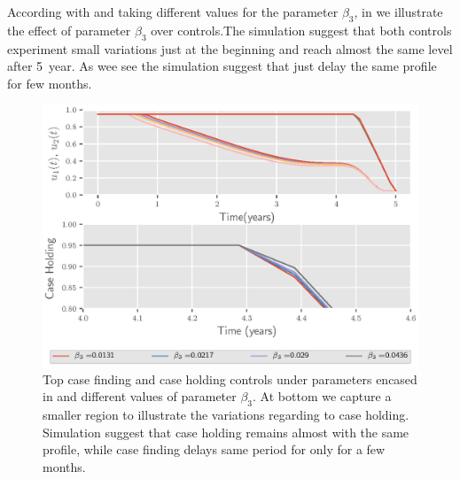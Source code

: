 According with  and taking different values
for the parameter $\beta_3$, in  we illustrate 
the effect of parameter $\beta_3$ over controls.The 
simulation suggest that both controls experiment small variations just at the 
beginning and reach almost the same level after \SI{5}{year}. As wee see the 
simulation suggest that just delay the same profile for few months.
%
\begin{figure}
  \centering
  \includegraphics{Figures/figure_2_two_strain_tbm}
  \caption{
    Top case finding and case holding controls 
    under parameters encased in  and
    different values of parameter $\beta_3$. At bottom we capture a smaller
    region to illustrate the variations regarding to case holding. Simulation 
    suggest 
    that case holding remains almost with the same profile, while case finding 
    delays same period for only for a few months.
  }\label{fig:figure2twostraintbm}
\end{figure}

